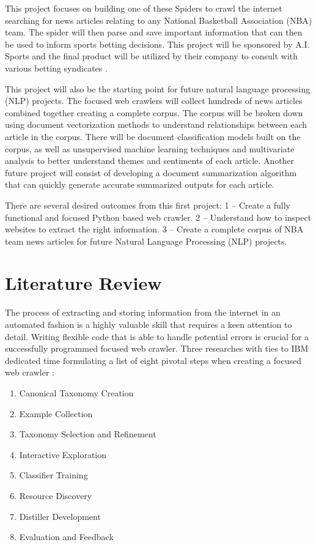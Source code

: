 \documentclass[5p,authoryear]{elsarticle}
\begin{document}
This project focuses on building one of these Spiders to crawl the internet searching for news articles relating to any National Basketball Association (NBA) team. The spider will then parse and save important information that can then be used to inform sports betting decisions. This project will be sponsored by A.I. Sports and the final product will be utilized by their company to consult with various betting syndicates \citep{aisports}.


This project will also be the starting point for future natural language processing (NLP) projects. The focused web crawlers will collect hundreds of news articles combined together creating a complete corpus. The corpus will be broken down using document vectorization methods to understand relationships between each article in the corpus. There will be document classification models built on the corpus, as well as unsupervised machine learning techniques and multivariate analysis to better understand themes and sentiments of each article. Another future project will consist of developing a document summarization algorithm that can quickly generate accurate summarized outputs for each article. 


There are several desired outcomes from this first project: 1 – Create a fully functional and focused Python based web crawler. 2 – Understand how to inspect websites to extract the right information. 3 – Create a complete corpus of NBA team news articles for future Natural Language Processing (NLP) projects. 



\section{Literature Review} \label{lit_rev}


The process of extracting and storing information from the internet in an automated fashion is a highly valuable skill that requires a keen attention to detail. Writing flexible code that is able to handle potential errors is crucial for a successfully programmed focused web crawler. Three researches with ties to IBM dedicated time formulating a list of eight pivotal steps when creating a focused web crawler \citep{focused}:

\begin{enumerate}
 \item Canonical Taxonomy Creation
 \item Example Collection
 \item Taxonomy Selection and Refinement
 \item Interactive Exploration 
 \item Classifier Training
 \item Resource Discovery 
 \item Distiller Development
 \item Evaluation and Feedback
\end{enumerate} \\
\end{document}
